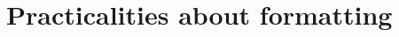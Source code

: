 \documentclass[Main]{subfiles}
\begin{document}
\section{Practicalities about formatting}
\end{document}
